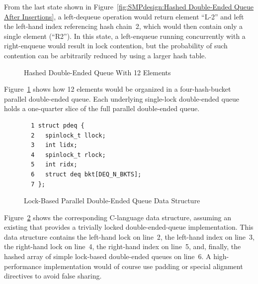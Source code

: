 From the last state shown in
Figure~\ref{fig:SMPdesign:Hashed Double-Ended Queue After Insertions},
a left-dequeue operation would return element ``L-2'' and left
the left-hand index referencing hash chain~2, which would then
contain only a single element (``R2'').
In this state, a left-enqueue running concurrently with a right-enqueue
would result in lock contention, but the probability of such contention
can be arbitrarily reduced by using a larger hash table.

\begin{figure}[tb]
\begin{center}
\end{center}
\caption{Hashed Double-Ended Queue With 12 Elements}
\label{fig:SMPdesign:Hashed Double-Ended Queue With 12 Elements}
\end{figure}

Figure~\ref{fig:SMPdesign:Hashed Double-Ended Queue With 12 Elements}
shows how 12 elements would be organized in a four-hash-bucket
parallel double-ended queue.
Each underlying single-lock double-ended queue holds a one-quarter
slice of the full parallel double-ended queue.

\begin{figure}[tbp]
{ \scriptsize
\begin{verbatim}
  1 struct pdeq {
  2   spinlock_t llock;
  3   int lidx;
  4   spinlock_t rlock;
  5   int ridx;
  6   struct deq bkt[DEQ_N_BKTS];
  7 };
\end{verbatim}
}
\caption{Lock-Based Parallel Double-Ended Queue Data Structure}
\label{fig:SMPdesign:Lock-Based Parallel Double-Ended Queue Data Structure}
\end{figure}

Figure~\ref{fig:SMPdesign:Lock-Based Parallel Double-Ended Queue Data Structure}
shows the corresponding C-language data structure, assuming an
existing  that provides a trivially locked
double-ended-queue implementation.
This data structure contains the left-hand lock on line~2,
the left-hand index on line~3, the right-hand lock on line~4,
the right-hand index on line~5, and, finally, the hashed array
of simple lock-based double-ended queues on line~6.
A high-performance implementation would of course use padding or special
alignment directives to avoid false sharing.

